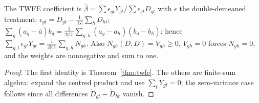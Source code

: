 \begin{lemma}
\label{lem:bacon-aux}
\leanok
{}
The TWFE coefficient is $\hat\beta = \sum\epsilon_{gt}Y_{gt}/\sum\epsilon_{gt}D_{gt}$ with $\epsilon$ the
double-demeaned treatment; $\epsilon_{gt} = \dot D_{gt} - \frac1{|G|}\sum_h\dot D_{ht}$;
$\sum_g(a_g - \bar a)b_g = \frac{1}{2|G|}\sum_{g,h}(a_g-a_h)(b_g-b_h)$; hence
$\sum_{g,t}\epsilon_{gt}Y_{gt} = \frac{1}{2|G|}\sum_{g,h}N_{gh}$. Also $N_{gh}(D,D) = V_{gh}\ge 0$, $V_{gh} = 0$ forces
$N_{gh} = 0$, and the weights are nonnegative and sum to one.
\end{lemma}
\begin{proof}
\leanok
The first identity is Theorem~\ref{thm:twfe}. The others are finite-sum algebra: expand the centred product and use
$\sum_t\dot Y_{gt} = 0$; the zero-variance case follows since all differences $\dot D_{gt}-\dot D_{ht}$ vanish.
\end{proof}

